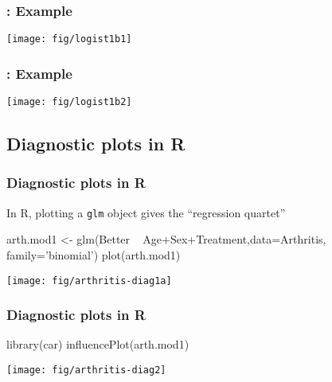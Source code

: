 \begin{frame}
  \frametitle{: Example}
 \begin{center}
  \texttt{[image: fig/logist1b1]}
 \end{center}

\end{frame}

\begin{frame}
  \frametitle{: Example}
 \begin{center}
  \texttt{[image: fig/logist1b2]}
 \end{center}

\end{frame}
\subsection{Diagnostic plots in R}
\begin{frame}[fragile]
  \frametitle{Diagnostic plots in R}
In R, plotting a \texttt{glm} object gives the ``regression quartet''
\begin{Rin}[baselinestretch=0.8]
arth.mod1 <- glm(Better ~ Age+Sex+Treatment,data=Arthritis,
             family='binomial')
plot(arth.mod1) 
\end{Rin}

 \begin{center}
  \texttt{[image: fig/arthritis-diag1a]}
 \end{center}
\end{frame}

\begin{frame}[fragile]
  \frametitle{Diagnostic plots in R}
\begin{Rin}[baselinestretch=0.9]
library(car)
influencePlot(arth.mod1) 
\end{Rin}
 \begin{center}
  \texttt{[image: fig/arthritis-diag2]}
 \end{center}
\end{frame}
